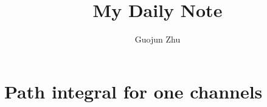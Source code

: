 \documentclass{book}
\author{Guojun Zhu}
\title{My Daily Note}
\begin{document}

{}

\tableofcontents
%
%
%
%
%
%

\section{Path integral for one channels}





\end{document}
